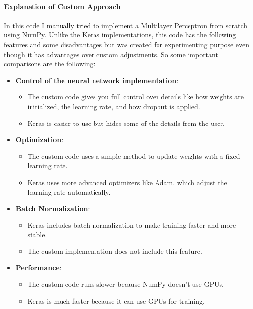 \documentclass[lettersize,journal]{IEEEtran}
\begin{document}
\paragraph{\textbf{Explanation of Custom Approach}}
In this code I manually tried to implement a Multilayer Perceptron from scratch using NumPy. Unlike the Keras implementations, this code has the following features and some disadvantages but was created for experimenting purpose even though it has advantages over custom adjustments. So some important comparisons are the following:
\begin{itemize}
 \item \textbf{Control of the neural network implementation}:
    \begin{itemize}
        \item The custom code gives you full control over details like how weights are initialized, the learning rate, and how dropout is applied.
        \item Keras is easier to use but hides some of the details from the user.
    \end{itemize}
    
    \item \textbf{Optimization}:
    \begin{itemize}
        \item The custom code uses a simple method to update weights with a fixed learning rate.
        \item Keras uses more advanced optimizers like Adam, which adjust the learning rate automatically.
    \end{itemize}
    
    \item \textbf{Batch Normalization}:
    \begin{itemize}
        \item Keras includes batch normalization to make training faster and more stable.
        \item The custom implementation does not include this feature.
    \end{itemize}
    
    \item \textbf{Performance}:
    \begin{itemize}
        \item The custom code runs slower because NumPy doesn’t use GPUs.
        \item Keras is much faster because it can use GPUs for training.
    \end{itemize}
    

\end{itemize}
\end{document}
